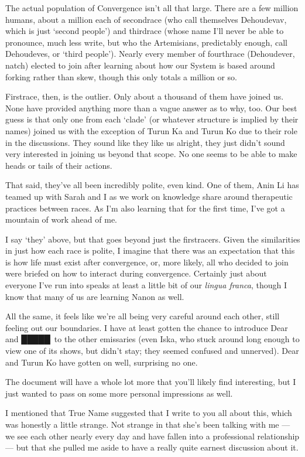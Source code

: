 The actual population of Convergence isn't all that large. There are a few million humans, about a million each of secondrace (who call themselves Dehoudevav, which is just `second people') and thirdrace (whose name I'll never be able to pronounce, much less write, but who the Artemisians, predictably enough, call Dehoudeves, or `third people'). Nearly every member of fourthrace (Dehoudever, natch) elected to join after learning about how our System is based around forking rather than skew, though this only totals a million or so.

Firstrace, then, is the outlier. Only about a thousand of them have joined us. None have provided anything more than a vague answer as to why, too. Our best guess is that only one from each `clade' (or whatever structure is implied by their names) joined us with the exception of Turun Ka and Turun Ko due to their role in the discussions. They sound like they like us alright, they just didn't sound very interested in joining us beyond that scope. No one seems to be able to make heads or tails of their actions.

That said, they've all been incredibly polite, even kind. One of them, Anin Li has teamed up with Sarah and I as we work on knowledge share around therapeutic practices between races. As I'm also learning that for the first time, I've got a mountain of work ahead of me.

I say `they' above, but that goes beyond just the firstracers. Given the similarities in just how each race is polite, I imagine that there was an expectation that this is how life must exist after convergence, or, more likely, all who decided to join were briefed on how to interact during convergence. Certainly just about everyone I've run into speaks at least a little bit of our \emph{lingua franca}, though I know that many of us are learning Nanon as well.

All the same, it feels like we're all being very careful around each other, still feeling out our boundaries. I have at least gotten the chance to introduce Dear and █████\ to the other emissaries (even Iska, who stuck around long enough to view one of its shows, but didn't stay; they seemed confused and unnerved). Dear and Turun Ko have gotten on well, surprising no one.

The document will have a whole lot more that you'll likely find interesting, but I just wanted to pass on some more personal impressions as well.

I mentioned that True Name suggested that I write to you all about this, which was honestly a little strange. Not strange in that she's been talking with me — we see each other nearly every day and have fallen into a professional relationship — but that she pulled me aside to have a really quite earnest discussion about it.

